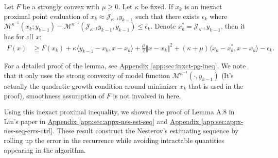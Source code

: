 \documentclass[12pt]{article}
\begin{document}
    \begin{lemma}\label{lemma:lin-ixct-prox-ineq}
        Let $F$ be a strongly convex with $\mu\ge 0$. 
        Let $\kappa$ be fixed. 
        If $x_k$ is an inexact proximal point evaluation of $x_k \approx \mathcal J_{\kappa^{-1}} y_{k - 1}$ such that there exists $\epsilon_k$ where $\mathcal M^{\kappa^{-1}}(x_k; y_{k - 1}) - \mathcal M^{\kappa^{-1}}(\mathcal J_{\kappa^{-1}} y_{k - 1}, y_{k - 1}) \le \epsilon_k$. 
        Denote $x_k^* = \mathcal J_{\kappa^{-1}} y_{k - 1}$, then it has for all $x$: 
        \begin{align*}
            F(x) &\ge 
            F(x_k) + \kappa \langle y_{k - 1} - x_k, x - x_k\rangle
            + \frac{\mu}{2}\Vert x - x_k\Vert^2 
            + (\kappa + \mu)\langle  x_k - x_k^*, x - x_k\rangle 
            - \epsilon_k.
        \end{align*}
    \end{lemma}
    \begin{remark}
        For a detailed proof of the lemma, see 
        \hyperref[app:sec:inxct-pg-ineq]{Appendix \ref*{app:sec:inxct-pg-ineq}}. 
        We note that it only uses the strong convexity of model function $\mathcal M^{\kappa^{-1}}(\cdot, y_{k - 1})$ (It's actually the quadratic growth condition around minimizer $x_k$ that is used in the proof), smoothness assumption of $F$ is not involved in here. 
    \end{remark}
    Using this inexact proximal inequality, we showed the proof of Lemma A.8 in Lin's paper \cite{lin_universal_2015} in 
    \hyperref[app:sec:appx-nes-est-seq]{Appendix \ref*{app:sec:appx-nes-est-seq}}
    and 
    \hyperref[app:sec:appx-nes-seq-errs-ctrl]{Appendix \ref*{app:sec:appx-nes-seq-errs-ctrl}}. 
    These result construct the Nesterov's estimating sequence by rolling up the error in the recurrence while avoiding intractable quantities appearing in the algorithm. 
    


    
\end{document}
